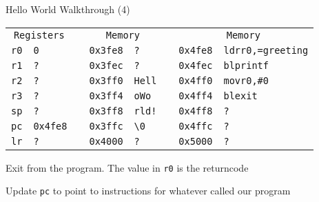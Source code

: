 \begin{frame}{Hello World Walkthrough (4)}
    \begin{alltt}
        \begin{tabular}{ r | l p{2mm} r | l p{2mm} r | l }
            \multicolumn{2}{c}{Registers} && \multicolumn{2}{c}{Memory} && \multicolumn{2}{c}{Memory} \\
            r0 & 0 && 0x3fe8 & ? && 0x4fe8 & ldr r0, =greeting \\
            r1 & ? && 0x3fec & ? && 0x4fec & bl printf \\
            r2 & ? && 0x3ff0 & Hell && 0x4ff0 & mov r0, \#0 \\
            r3 & ? && 0x3ff4 & o Wo && 0x4ff4 & bl exit \\
            sp & ? && 0x3ff8 & rld! && 0x4ff8 & ? \\
            pc & 0x4fe8 && 0x3ffc & {\textbackslash}0 && 0x4ffc & ? \\
            lr & ? && 0x4000 & ? && 0x5000 & ? \\
            \end{tabular}
        \end{alltt}

        Exit from the program. The value in \texttt{r0} is the returncode

        Update \texttt{pc} to point to instructions for whatever called our program

\end{frame}

















